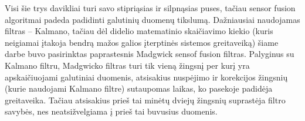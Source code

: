 \documentclass[]{vgtuef}
\begin{document}
Visi šie trys davikliai turi savo stipriąsias ir silpnąsias puses, tačiau sensor fusion algoritmai padeda padidinti galutinių duomenų tikslumą. Dažniausiai naudojamas filtras – Kalmano, tačiau dėl didelio matematinio skaičiavimo kiekio (kuris neigiamai įtakoja bendrą mažos galios įterptinės sistemos greitaveiką) šiame darbe buvo pasirinktas paprastesnis Madgwick sensof fusion filtras. Palyginus su Kalmano filtru, Madgwicko filtras turi tik vieną žingsnį per kurį yra apskaičiuojami galutiniai duomenis, atsisakius nuspėjimo ir korekcijos žingsnių (kurie naudojami Kalmano filtre) sutaupomas laikas, ko pasekoje padidėja greitaveika. Tačiau atsisakius prieš tai minėtų dviejų žingsnių suprastėja filtro savybės, nes neatsižvelgiama į prieš tai buvusius duomenis.
\end{document}
